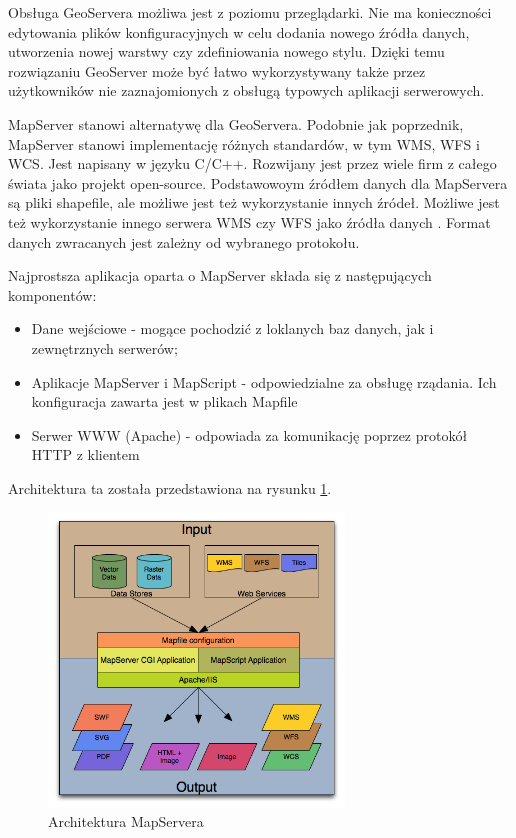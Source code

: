 Obsługa GeoServera możliwa jest z poziomu przeglądarki. Nie ma konieczności edytowania plików konfiguracyjnych
w celu dodania nowego źródła danych, utworzenia nowej warstwy czy zdefiniowania nowego stylu. Dzięki temu rozwiązaniu
GeoServer może być łatwo wykorzystywany także przez użytkowników nie zaznajomionych z obsługą typowych aplikacji serwerowych.

MapServer stanowi alternatywę dla GeoServera. Podobnie jak poprzednik, MapServer stanowi implementację różnych standardów,
w tym WMS, WFS i WCS. Jest napisany w języku C/C++. Rozwijany jest przez wiele firm z całego świata jako projekt open-source.
Podstawowoym źródłem danych dla MapServera są pliki shapefile, ale możliwe jest też wykorzystanie innych źródeł. 
Możliwe jest też wykorzystanie innego serwera WMS czy WFS jako źródła danych \cite{MapServer2011}.
Format danych zwracanych jest zależny od wybranego protokołu.

Najprostsza aplikacja oparta o MapServer składa się z następujących komponentów:
\begin{itemize}
    \item Dane wejściowe - mogące pochodzić z loklanych baz danych, jak i zewnętrznych serwerów;
    \item Aplikacje MapServer i MapScript - odpowiedzialne za obsługę rządania. Ich konfiguracja zawarta jest w plikach Mapfile
    \item Serwer WWW (Apache) - odpowiada za komunikację poprzez protokół HTTP z klientem
\end{itemize}

Architektura ta została przedstawiona na rysunku \ref{fig:mapserver_architecture}.
\begin{figure}[h!]
    \centering
    \includegraphics[width=0.7\textwidth]{img/mapserver_architecture.png}
    \caption{Architektura MapServera}
    \label{fig:mapserver_architecture}
\end{figure}

